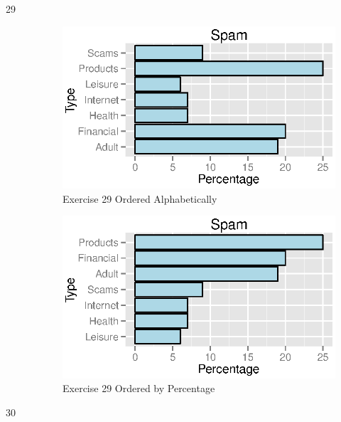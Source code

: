\documentclass{exam}
\begin{document}
\begin{description}
      \item[29]
        \begin{figure}[H]
          \centering
          \includegraphics{figures/ex29a.eps}
          \caption{Exercise 29 Ordered Alphabetically}
        \end{figure}

        \begin{figure}[H]
          \centering
          \includegraphics{figures/ex29b.eps}
          \caption{Exercise 29 Ordered by Percentage}
        \end{figure}

      \item[30]
      \pagebreak
\end{description}
\end{document}
